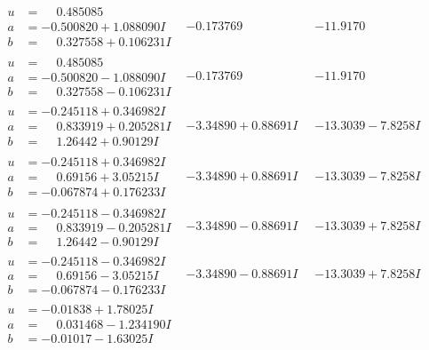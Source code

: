 \documentclass[1p]{elsarticle_modified}
\theoremstyle{definition}
\begin{document}
$$\begin{array}{c|c|c}
\begin{aligned}
u &= \phantom{-}0.485085\phantom{ +0.000000I} \\
a &= -0.500820 + 1.088090 I \\
b &= \phantom{-}0.327558 + 0.106231 I\end{aligned}
 & -0.173769\phantom{ +0.000000I} & -11.9170\phantom{ +0.000000I} \\ \hline\begin{aligned}
u &= \phantom{-}0.485085\phantom{ +0.000000I} \\
a &= -0.500820 - 1.088090 I \\
b &= \phantom{-}0.327558 - 0.106231 I\end{aligned}
 & -0.173769\phantom{ +0.000000I} & -11.9170\phantom{ +0.000000I} \\ \hline\begin{aligned}
u &= -0.245118 + 0.346982 I \\
a &= \phantom{-}0.833919 + 0.205281 I \\
b &= \phantom{-}1.26442 + 0.90129 I\end{aligned}
 & -3.34890 + 0.88691 I & -13.3039 - 7.8258 I \\ \hline\begin{aligned}
u &= -0.245118 + 0.346982 I \\
a &= \phantom{-}0.69156 + 3.05215 I \\
b &= -0.067874 + 0.176233 I\end{aligned}
 & -3.34890 + 0.88691 I & -13.3039 - 7.8258 I \\ \hline\begin{aligned}
u &= -0.245118 - 0.346982 I \\
a &= \phantom{-}0.833919 - 0.205281 I \\
b &= \phantom{-}1.26442 - 0.90129 I\end{aligned}
 & -3.34890 - 0.88691 I & -13.3039 + 7.8258 I \\ \hline\begin{aligned}
u &= -0.245118 - 0.346982 I \\
a &= \phantom{-}0.69156 - 3.05215 I \\
b &= -0.067874 - 0.176233 I\end{aligned}
 & -3.34890 - 0.88691 I & -13.3039 + 7.8258 I \\ \hline\begin{aligned}
u &= -0.01838 + 1.78025 I \\
a &= \phantom{-}0.031468 - 1.234190 I \\
b &= -0.01017 - 1.63025 I\end{aligned}

\end{array}$$
\end{document}

